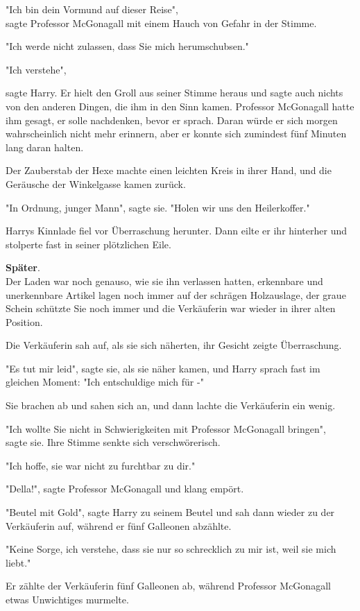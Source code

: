 {"Ich bin dein Vormund auf dieser Reise",\\ sagte Professor McGonagall mit einem Hauch von Gefahr in der Stimme.

"Ich werde nicht zulassen, dass Sie mich herumschubsen."

"Ich verstehe",

sagte Harry. Er hielt den Groll aus seiner Stimme heraus und sagte auch nichts von den anderen Dingen, die ihm in den Sinn kamen. Professor McGonagall hatte ihm gesagt, er solle nachdenken, bevor er sprach. Daran würde er sich morgen wahrscheinlich nicht mehr erinnern, aber er konnte sich zumindest fünf Minuten lang daran halten.

Der Zauberstab der Hexe machte einen leichten Kreis in ihrer Hand, und die Geräusche der Winkelgasse kamen zurück.

"In Ordnung, junger Mann", sagte sie. "Holen wir uns den Heilerkoffer."

Harrys Kinnlade fiel vor Überraschung herunter. Dann eilte er ihr hinterher und stolperte fast in seiner plötzlichen Eile.

\textbf{Später}.\\ Der Laden war noch genauso, wie sie ihn verlassen hatten, erkennbare und unerkennbare Artikel lagen noch immer auf der schrägen Holzauslage, der graue Schein schützte Sie noch immer und die Verkäuferin war wieder in ihrer alten Position.

Die Verkäuferin sah auf, als sie sich näherten, ihr Gesicht zeigte Überraschung.

"Es tut mir leid", sagte sie, als sie näher kamen, und Harry sprach fast im gleichen Moment: "Ich entschuldige mich für -"

Sie brachen ab und sahen sich an, und dann lachte die Verkäuferin ein wenig.

"Ich wollte Sie nicht in Schwierigkeiten mit Professor McGonagall bringen",\\ sagte sie. Ihre Stimme senkte sich verschwörerisch.

"Ich hoffe, sie war nicht zu furchtbar zu dir."

"Della!", sagte Professor McGonagall und klang empört.

"Beutel mit Gold", sagte Harry zu seinem Beutel und sah dann wieder zu der Verkäuferin auf, während er fünf Galleonen abzählte.

"Keine Sorge, ich verstehe, dass sie nur so schrecklich zu mir ist, weil sie mich liebt."

Er zählte der Verkäuferin fünf Galleonen ab, während Professor McGonagall etwas Unwichtiges murmelte.

}
